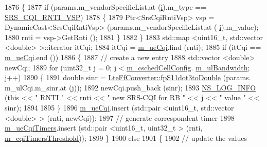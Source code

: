 \begin{DoxyCode}
1876           \{
1877             \textcolor{keywordflow}{if} (params.m\_vendorSpecificList.at (\hyperlink{bernuolliDistribution_8m_a6f6ccfcf58b31cb6412107d9d5281426}{i}).m\_type == \hyperlink{lte-vendor-specific-parameters_8h_a3b5e6e766032ab4a8e374a1cfd237a26}{SRS\_CQI\_RNTI\_VSP})
1878               \{
1879                 Ptr<SrsCqiRntiVsp> vsp = DynamicCast<SrsCqiRntiVsp> (params.m\_vendorSpecificList.at (
      \hyperlink{bernuolliDistribution_8m_a6f6ccfcf58b31cb6412107d9d5281426}{i}).m\_value);
1880                 rnti = vsp->GetRnti ();
1881               \}
1882           \}
1883         std::map <uint16\_t, std::vector <double> >::iterator itCqi;
1884         itCqi = \hyperlink{classns3_1_1TdBetFfMacScheduler_a869067679aa0a846212a1fb509c1d702}{m\_ueCqi}.find (rnti);
1885         \textcolor{keywordflow}{if} (itCqi == \hyperlink{classns3_1_1TdBetFfMacScheduler_a869067679aa0a846212a1fb509c1d702}{m\_ueCqi}.end ())
1886           \{
1887             \textcolor{comment}{// create a new entry}
1888             std::vector <double> newCqi;
1889             \textcolor{keywordflow}{for} (uint32\_t j = 0; j < \hyperlink{classns3_1_1TdBetFfMacScheduler_a3e53aae0259501332769cd6ca4b74800}{m\_cschedCellConfig}.
      \hyperlink{structns3_1_1FfMacCschedSapProvider_1_1CschedCellConfigReqParameters_a5ab5b102878e6e7e7727a14af4a64d2f}{m\_ulBandwidth}; j++)
1890               \{
1891                 \textcolor{keywordtype}{double} sinr = \hyperlink{classns3_1_1LteFfConverter_aa5d8c2a8f988dbd63da91818c18666eb}{LteFfConverter::fpS11dot3toDouble} (params.
      m\_ulCqi.m\_sinr.at (j));
1892                 newCqi.push\_back (sinr);
1893                 \hyperlink{group__logging_gafbd73ee2cf9f26b319f49086d8e860fb}{NS\_LOG\_INFO} (\textcolor{keyword}{this} << \textcolor{stringliteral}{" RNTI "} << rnti << \textcolor{stringliteral}{" new SRS-CQI for RB  "} << j << \textcolor{stringliteral}{" value
       "} << sinr);
1894 
1895               \}
1896             \hyperlink{classns3_1_1TdBetFfMacScheduler_a869067679aa0a846212a1fb509c1d702}{m\_ueCqi}.insert (std::pair <uint16\_t, std::vector <double> > (rnti, newCqi));
1897             \textcolor{comment}{// generate correspondent timer}
1898             \hyperlink{classns3_1_1TdBetFfMacScheduler_a89b7106fc5de30b9153316aa3ea2d368}{m\_ueCqiTimers}.insert (std::pair <uint16\_t, uint32\_t > (rnti, 
      \hyperlink{classns3_1_1TdBetFfMacScheduler_ad423d7c181e089b37159502bad92bccd}{m\_cqiTimersThreshold}));
1899           \}
1900         \textcolor{keywordflow}{else}
1901           \{
1902             \textcolor{comment}{// update the values}

\end{DoxyCode}
